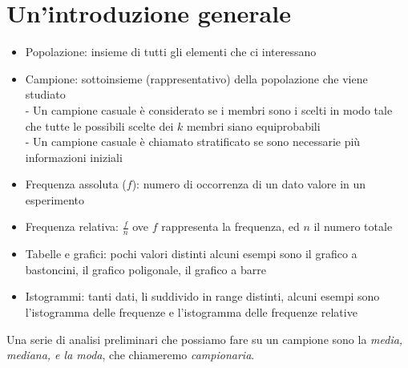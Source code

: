 %
%
%
%



\section{Un'introduzione generale}
\begin{itemize}
\item Popolazione: insieme di tutti gli elementi che ci interessano
\item Campione: sottoinsieme (rappresentativo) della popolazione che viene studiato\\
		- Un campione casuale è considerato se i membri sono i scelti in modo tale che tutte le possibili scelte dei $k$ membri siano equiprobabili\\
		- Un campione casuale è chiamato stratificato se sono necessarie più informazioni iniziali
\item Frequenza assoluta ($f$): numero di occorrenza di un dato valore in un esperimento
\item Frequenza relativa: $\frac{f}{n}$ ove $f$ rappresenta la frequenza, ed $n$ il numero totale
\item Tabelle e grafici: pochi valori distinti alcuni esempi sono il grafico a bastoncini, il grafico poligonale, il grafico a barre
\item Istogrammi: tanti dati, li suddivido in range distinti, alcuni esempi sono l'istogramma delle frequenze e l'istogramma delle frequenze relative
\end{itemize}
Una serie di analisi preliminari che possiamo fare su un campione sono la \emph{media, mediana, e la moda}, che chiameremo \emph{campionaria}. 

